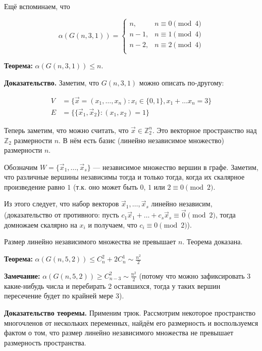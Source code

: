 \documentclass[12pt]{article}
\begin{document}
Ещё вспоминаем, что

\[
\alpha(G(n, 3, 1)) =
\begin{cases}
n, & n \equiv 0 \pmod 4 \\
n-1, & n \equiv 1 \pmod 4 \\
n-2, & n \equiv 2 \pmod 4 \\
\end{cases}
\]

\textbf{Теорема:} $\alpha(G(n, 3, 1)) \leq n$.

\textbf{Доказательство.} Заметим, что $G(n, 3, 1)$ можно описать по-другому:

\begin{align*}
V &= \{ \vec x = (x_1, \ldots, x_n) \colon x_i \in \{ 0, 1 \}, x_1 + \ldots x_n = 3 \} \\
E &= \{ \{ \vec x_1, \vec x_2 \} \colon (x_1, x_2) = 1 \}
\end{align*}

Теперь заметим, что можно считать, что $\vec x \in \mathbb{Z}_2^n$. Это векторное пространство над $\mathbb{Z}_2$ размерности $n$. В нём есть базис (линейно независимое множество) размерности $n$.

Обозначим $W = \{ \vec x_1 , \ldots , \vec x_s \}$ — независимое множество вершин в графе. Заметим, что различные вершины независимы тогда и только тогда, когда их скалярное произведение равно $1$ (т.к. оно может быть $0$, $1$ или $2 \equiv 0 \pmod 2$.

Из этого следует, что набор векторов $\vec x_1, \ldots, \vec x_s$ линейно независим, (доказательство от противного: пусть $c_1 \vec x_1 + \ldots + c_s \vec x_s \equiv \vec 0 \pmod 2$, тогда домножаем скалярно на $x_i$ и получаем, что $c_i \equiv 0 \pmod 2$).

Размер линейно независимого множества не превышает $n$. Теорема доказана.

\textbf{Теорема:} $\alpha(G(n, 5, 2)) \leq C^2_n + 2 C^1_n \sim \frac {n^2} 2$

\textbf{Замечание:} $\alpha(G(n, 5, 2)) \geq C^2_{n-3} \sim \frac {n^2} 2$ (потому что можно зафиксировать 3 какие-нибудь числа и перебирать 2 оставшихся, тогда у таких вершин пересечение будет по крайней мере 3).

\textbf{Доказательство теоремы.} Применим трюк. Рассмотрим некоторое пространство многочленов от нескольких переменных, найдём его размерность и воспользуемся фактом о том, что размер линейно независимого множества не превышает размерность пространства.
\end{document}
